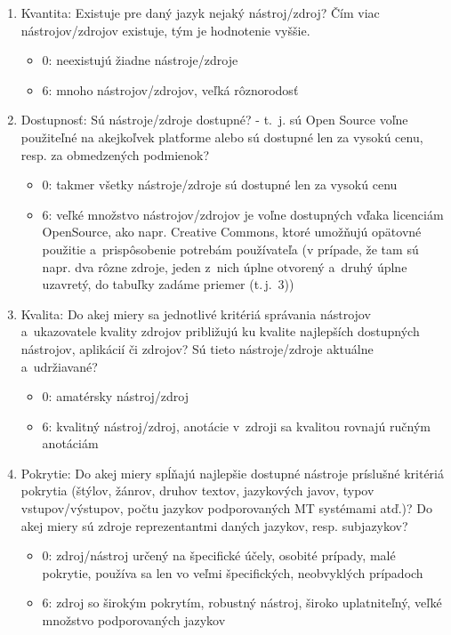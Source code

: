 \begin{multicols}{2}
\begin{enumerate}
\item Kvantita: Existuje pre daný jazyk nejaký nástroj/zdroj? Čím viac nástrojov/zdrojov existuje, tým je hodnotenie vyššie.
\begin{itemize}
\item 0: neexistujú žiadne nástroje/zdroje
\item 6: mnoho nástrojov/zdrojov, veľká rôznorodosť
\end{itemize}
\item Dostupnosť: Sú nástroje/zdroje dostupné? - t.~j. sú Open Source voľne použiteľné na akejkoľvek platforme alebo sú dostupné len za vysokú cenu, resp. za obmedzených podmienok?
\begin{itemize}
\item 0: takmer všetky nástroje/zdroje sú dostupné len za vysokú cenu
\item 6: veľké množstvo nástrojov/zdro\-jov je voľne dostupných vďaka licenciám OpenSource, ako napr. Creative Commons, ktoré umožňujú opätovné použitie a~prispôsobenie potrebám používateľa (v prípade, že tam sú napr. dva rôzne zdroje, jeden z~nich úplne otvorený a~druhý úplne uzavretý, do tabuľky zadáme priemer (t.\,j.~3))
\end{itemize}
\item Kvalita: Do akej miery sa jednotlivé kritériá správania nástrojov a~ukazovatele kvality zdrojov približujú ku kvalite najlepších dostupných nástrojov, aplikácií či zdrojov? Sú tieto nástroje/zdroje aktuálne a~udržiavané?
\begin{itemize}
\item 0: amatérsky nástroj/zdroj
\item 6: kvalitný nástroj/zdroj, anotácie v~zdroji sa kvalitou rovnajú ručným anotáciám
\end{itemize}
\item Pokrytie: Do akej miery spĺňajú najlepšie dostupné nástroje príslušné kritériá pokrytia (štýlov, žánrov, druhov textov, jazykových javov, typov vstupov/výstupov, počtu jazykov podporovaných MT systémami atď.)? Do akej miery sú zdroje reprezentantmi daných jazykov, resp. subjazykov?
\begin{itemize}
\item 0: zdroj/nástroj určený na špecifické účely, osobité prípady, malé pokrytie, používa sa len vo veľmi špecifických, neobvyklých prípadoch
\item 6: zdroj so širokým pokrytím, robustný nástroj, široko uplatniteľný, veľké množstvo podporovaných jazykov

\end{itemize}
\end{enumerate}
\end{multicols}
